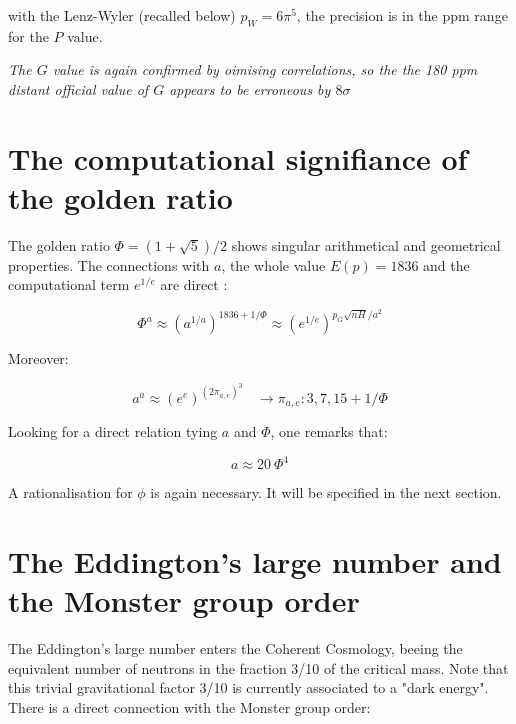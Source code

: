 \documentclass[a4paper,9pt]{article}
\begin{document}
with the Lenz-Wyler (recalled below) $p_W = 6\pi^5$, the precision is in the ppm range for the $P$ value.

\textit{The $G$ value is again confirmed by oimising correlations, so the the 180 ppm distant official value of $G$ appears to be erroneous by $8 \sigma$}




















   
   
  \section{The computational signifiance of the golden ratio} 
  
  The golden ratio $\Phi = (1+\sqrt 5)/2$ shows singular arithmetical and geometrical properties. The connections with $a$, the whole value $E(p) = 1836$ and the computational term $e^{1/e}$ are direct :
  
\begin{equation}
\Phi^a \approx (a^{1/a})^{1836 + 1/\Phi} \approx (e^{1/e})^{p_G \sqrt{nH}/a^2}
\end{equation}    
  
Moreover:

\begin{equation}
a^a \approx (e^e)^{(2\pi_{a,e})^3}     ~~~~ \rightarrow   \pi_{a,e} : 3, 7, 15 + 1/\Phi
\end{equation}  
   
Looking for a direct relation tying $a$ and $\Phi$, one remarks that: 

\begin{equation}
a \approx 20 ~ \Phi^4
\end{equation}  
   
A rationalisation for $\phi$ is again necessary. It will be specified in the next section.





   
\section{The Eddington's large number and the Monster group order}

The Eddington's large number enters the Coherent Cosmology, beeing the equivalent number of neutrons in the fraction 3/10 of the critical mass. Note that this trivial gravitational factor 3/10 is currently associated to a "dark energy". There is a direct connection with the Monster group order:
\end{document}
